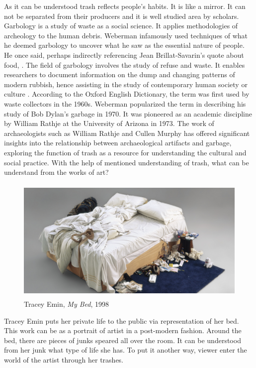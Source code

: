 As it can be understood trash reflects people's habits. It is like a mirror. It can not be separated from their producers and it is well studied area by scholars. Garbology is a study of waste as a social science. It applies methodologies of archeology to the human debris. Weberman infamously used techniques of what he deemed garbology to uncover what he saw as the essential nature of people. He once said, perhaps indirectly referencing Jean Brillat-Savarin’s quote about food,  \citep[as cited in][301]{lukas2012garbage}. The field of garbology involves the study of refuse and waste. It enables researchers to document information on the dump and changing patterns of modern rubbish, hence assisting in the study of contemporary human society or culture \citep{roy2012garbology}. According to the Oxford English Dictionary, the term was first used by waste collectors in the 1960s. Weberman popularized the term in describing his study of Bob Dylan’s garbage in 1970. It was pioneered as an academic discipline by William Rathje at the University of Arizona in 1973. The work of archaeologists such as William Rathje and Cullen Murphy has offered significant insights into the relationship between archaeological artifacts and garbage, exploring the function of trash as a resource for understanding the cultural and social practice. With the help of mentioned understanding of trash, what can be understand from the works of art?

\begin{figure}[h!]
  \centering
  \includegraphics[height=6cm]{graphics/tracey-emin-my-bed.jpg}
  \caption{Tracey Emin, \textit{My Bed}, 1998}
  \label{fig:TraceyEmin_MyBed}
\end{figure}

Tracey Emin puts her private life to the public via representation of her bed. This work can be as a portrait of artist in a post-modern fashion. Around the bed, there are pieces of junks speared all over the room. It can be understood from her junk what type of life she has. To put it another way, viewer enter the world of the artist through her trashes.

